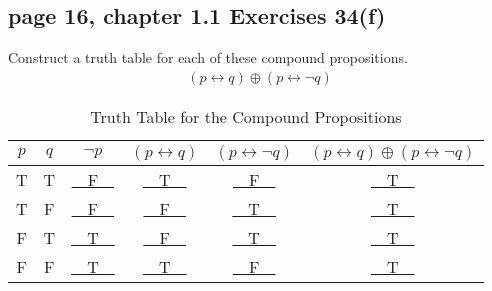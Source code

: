 \documentclass[sigconf]{acmart}
\begin{document}
\subsection{page 16, chapter 1.1 Exercises 34(f)}
\begin{shaded}
    Construct a truth table for each of these compound propositions.
    \begin{eqnarray*}
    	(p \leftrightarrow q) \oplus (p \leftrightarrow \neg q)
    \end{eqnarray*}
\end{shaded} 
\begin{table}[h]
	\centering
	\caption{Truth Table for the Compound Propositions}
	\label{t1}
	\begin{tabular}{c|c|c|c|c|c}
    	\hline
    	 $p$ & $q$ & $\neg p$ & $(p \leftrightarrow q)$ & $(p \leftrightarrow \neg q)$ & $ (p \leftrightarrow q) \oplus (p \leftrightarrow \neg q)$  \\ \hline
    	 T  & T & \underline{~~F~~} & \underline{~~T~~} & \underline{~~F~~} & \underline{~~T~~} \\ 
    	 T  & F & \underline{~~F~~} & \underline{~~F~~} & \underline{~~T~~} & \underline{~~T~~} \\ 
    	 F  & T & \underline{~~T~~} & \underline{~~F~~} & \underline{~~T~~} & \underline{~~T~~} \\ 
    	 F  & F & \underline{~~T~~} & \underline{~~T~~} & \underline{~~F~~} & \underline{~~T~~} \\ 
    	\hline
	\end{tabular}
\end{table}
\end{document}
